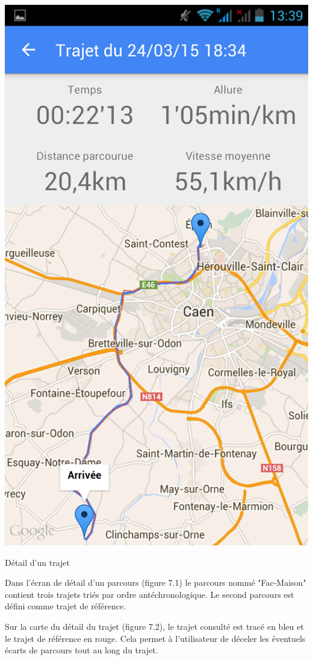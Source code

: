 \begin{multicols}{2}
\begin{img}
  \includegraphics[scale=0.35]{img/trajet.jpg}
  \caption{Détail d'un trajet}
\end{img}
\end{multicols}

Dans l'écran de détail d'un parcours (figure 7.1) le parcours nommé "Fac-Maison" contient trois trajets triés par ordre antéchronologique. Le second parcours est défini comme trajet de référence.\bigskip

Sur la carte du détail du trajet (figure 7.2), le trajet consulté est tracé en bleu et le trajet de référence en rouge. Cela permet à l'utilisateur de déceler les éventuels écarts de parcours tout au long du trajet.